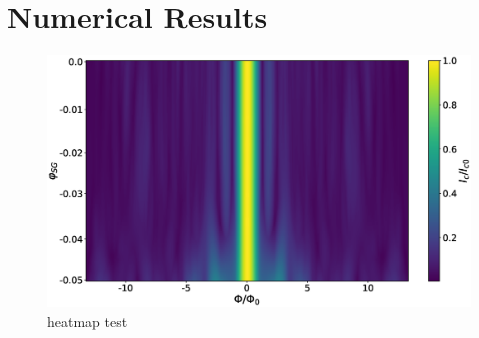 \chapter{Numerical Results}
\label{ch:numerical-results}
\begin{figure}
\includegraphics[width=\textwidth]{figure/numericalmodel/qpc_icnorm_heatmap}
\caption{heatmap test}
\end{figure}